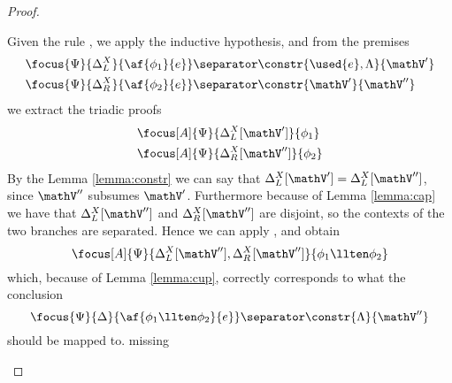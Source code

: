 \begin{proof}
	\begin{itemize}
		\indCase{\displayten} Given the rule \derRule{\displayten}, we apply the inductive hypothesis, and from the premises 
			\begin{align*}
				&\focus{\Psi}{\Delta_L^X}{\af{\phi_1}{e}} \separator \constr{\used{e}, \Lambda}{\mathV'} \\
				&\focus{\Psi}{\Delta_R^X}{\af{\phi_2}{e}} \separator \constr{\mathV'}{\mathV''} 
			\end{align*}
			we extract the triadic proofs
			\begin{align*}
				&\focus[A]{\Psi}{\Delta_L^X[\mathV']}{\phi_1} \\
				&\focus[A]{\Psi}{\Delta_R^X[\mathV'']}{\phi_2} 
			\end{align*}
			By the Lemma \ref{lemma:constr} we can say that $\Delta_L^X[\mathV'] = \Delta_L^X[\mathV'']$, since $\mathV''$ subsumes $\mathV'$.
			Furthermore because of Lemma \ref{lemma:cap} we have that $\Delta_L^X[\mathV'']$ and $\Delta_R^X[\mathV'']$ are disjoint, so the contexts of the two branches are separated.
			Hence we can apply \derRule[A]{\displayten}, and obtain
			$$ \focus[A]{\Psi}{\Delta_L^X[\mathV''], \Delta_R^X[\mathV'']}{\phi_1 \llten \phi_2} $$
			which, because of Lemma \ref{lemma:cup}, correctly corresponds to what the conclusion
			$$ \focus{\Psi}{\Delta}{\af{\phi_1 \llten \phi_2}{e}} \separator \constr{\Lambda}{\mathV''} $$
			should be mapped to.
		\indCase{\displaywith} missing %

\end{itemize}
\end{proof}
